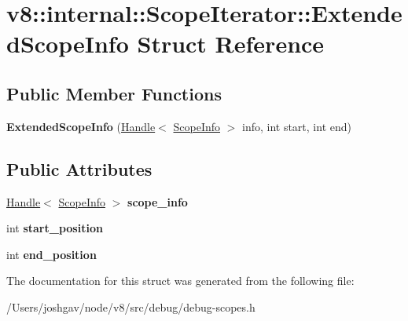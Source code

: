 \hypertarget{structv8_1_1internal_1_1_scope_iterator_1_1_extended_scope_info}{}\section{v8\+:\+:internal\+:\+:Scope\+Iterator\+:\+:Extended\+Scope\+Info Struct Reference}
\label{structv8_1_1internal_1_1_scope_iterator_1_1_extended_scope_info}
\subsection*{Public Member Functions}
\begin{DoxyCompactItemize}
\item 
{\bfseries Extended\+Scope\+Info} (\hyperlink{classv8_1_1internal_1_1_handle}{Handle}$<$ \hyperlink{classv8_1_1internal_1_1_scope_info}{Scope\+Info} $>$ info, int start, int end)\hypertarget{structv8_1_1internal_1_1_scope_iterator_1_1_extended_scope_info_a601cd58f24f38089848bb5f77825d3e2}{}\label{structv8_1_1internal_1_1_scope_iterator_1_1_extended_scope_info_a601cd58f24f38089848bb5f77825d3e2}

\end{DoxyCompactItemize}
\subsection*{Public Attributes}
\begin{DoxyCompactItemize}
\item 
\hyperlink{classv8_1_1internal_1_1_handle}{Handle}$<$ \hyperlink{classv8_1_1internal_1_1_scope_info}{Scope\+Info} $>$ {\bfseries scope\+\_\+info}\hypertarget{structv8_1_1internal_1_1_scope_iterator_1_1_extended_scope_info_a62c3f5a06917c6ef66145e7f08b7ab61}{}\label{structv8_1_1internal_1_1_scope_iterator_1_1_extended_scope_info_a62c3f5a06917c6ef66145e7f08b7ab61}

\item 
int {\bfseries start\+\_\+position}\hypertarget{structv8_1_1internal_1_1_scope_iterator_1_1_extended_scope_info_ab621f5b211991424d2dce13cecc5fcce}{}\label{structv8_1_1internal_1_1_scope_iterator_1_1_extended_scope_info_ab621f5b211991424d2dce13cecc5fcce}

\item 
int {\bfseries end\+\_\+position}\hypertarget{structv8_1_1internal_1_1_scope_iterator_1_1_extended_scope_info_ab6cf549c6e3d3c3da84896743d03509e}{}\label{structv8_1_1internal_1_1_scope_iterator_1_1_extended_scope_info_ab6cf549c6e3d3c3da84896743d03509e}

\end{DoxyCompactItemize}


The documentation for this struct was generated from the following file\+:\begin{DoxyCompactItemize}
\item 
/\+Users/joshgav/node/v8/src/debug/debug-\/scopes.\+h\end{DoxyCompactItemize}
